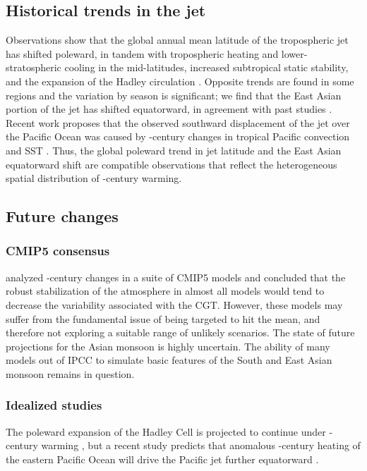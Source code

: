 \subsection{Historical trends in the jet}
	Observations show that the global annual mean latitude of the tropospheric jet has shifted poleward, in tandem with tropospheric heating and lower-stratospheric cooling in the mid-latitudes, increased subtropical static stability, and the expansion of the Hadley circulation \citep{Fu2006,Archer2008,Fu2011}. Opposite trends are found in some regions and the variation by season is significant; we find that the East Asian portion of the jet has shifted equatorward, in agreement with past studies \citep{Yu2007, Archer2008}. Recent work proposes that the observed southward displacement of the jet over the Pacific Ocean was caused by -century changes in tropical Pacific convection and SST \citep{Park2014a}. Thus, the global poleward trend in jet latitude and the East Asian equatorward shift are compatible observations that reflect the heterogeneous spatial distribution of -century warming.

\subsection{Future changes}
\subsubsection{CMIP5 consensus}
	\citet{Lee2014} analyzed -century changes in a suite of CMIP5 models and concluded that the robust stabilization of the atmosphere in almost all models would tend to decrease the variability associated with the CGT. However, these models may suffer from the fundamental issue of being targeted to hit the mean, and therefore not exploring a suitable range of unlikely scenarios. The state of future projections for the Asian monsoon is highly uncertain. The ability of many models out of IPCC to simulate basic features of the South and East Asian monsoon remains in question.

\subsubsection{Idealized studies}
	The poleward expansion of the Hadley Cell is projected to continue under -century warming \citep{Frierson2007,Lu2007,Kang2012}, but a recent study predicts that anomalous -century heating of the eastern Pacific Ocean will drive the Pacific jet further equatorward \citep{Park2014}.
		 
